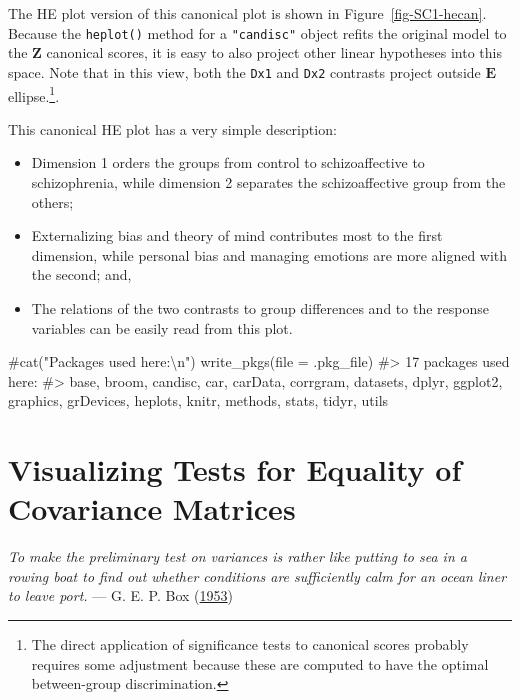\documentclass[
  letterpaper,
  10pt,
  krantz2]{krantz}
\makeatletter
\newenvironment{Shaded}{\begin{snugshade}}{\end{snugshade}}
\newcommand{\AttributeTok}[1]{\textcolor[rgb]{0.40,0.45,0.13}{#1}}
\newcommand{\CommentTok}[1]{\textcolor[rgb]{0.37,0.37,0.37}{#1}}
\newcommand{\FunctionTok}[1]{\textcolor[rgb]{0.28,0.35,0.67}{#1}}
\newcommand{\NormalTok}[1]{\textcolor[rgb]{0.00,0.23,0.31}{#1}}
\providecommand{\tightlist}{%
  \setlength{\itemsep}{0pt}\setlength{\parskip}{0pt}}\usepackage{longtable,booktabs,array}
\renewenvironment{quote}{\begin{VF}}{\end{VF}}
\newenvironment{kframe}{%
  \medskip{}
  \setlength{\fboxsep}{.8em}
  \def\at@end@of@kframe{}%
  \ifinner\ifhmode%
  \def\at@end@of@kframe{\end{minipage}}%
  \begin{minipage}{\columnwidth}%
  \fi\fi%
  \def\FrameCommand##1{\hskip\@totalleftmargin \hskip-\fboxsep
  \colorbox{shadecolor}{##1}\hskip-\fboxsep
      \hskip-\linewidth \hskip-\@totalleftmargin \hskip\columnwidth}%
  \MakeFramed {\advance\hsize-\width
    \@totalleftmargin\z@ \linewidth\hsize
    \@setminipage}}%
{\par\unskip\endMakeFramed%
  \at@end@of@kframe}
\renewenvironment{Shaded}{\begin{kframe}}{\end{kframe}}
\makeatother
\begin{document}
The HE plot version of this canonical plot is shown in
Figure~\ref{fig-SC1-hecan}. Because the \texttt{heplot()} method for a
\texttt{"candisc"} object refits the original model to the
\(\mathbf{Z}\) canonical scores, it is easy to also project other linear
hypotheses into this space. Note that in this view, both the
\texttt{Dx1} and \texttt{Dx2} contrasts project outside \(\mathbf{E}\)
ellipse.\footnote{The direct application of significance tests to
  canonical scores probably requires some adjustment because these are
  computed to have the optimal between-group discrimination.}.

This canonical HE plot has a very simple description:

\begin{itemize}
\tightlist
\item
  Dimension 1 orders the groups from control to schizoaffective to
  schizophrenia, while dimension 2 separates the schizoaffective group
  from the others;
\item
  Externalizing bias and theory of mind contributes most to the first
  dimension, while personal bias and managing emotions are more aligned
  with the second; and,
\item
  The relations of the two contrasts to group differences and to the
  response variables can be easily read from this plot.
\end{itemize}

\begin{Shaded}
\begin{Highlighting}[]
\CommentTok{\#cat("Packages used here:\textbackslash{}n")}
\FunctionTok{write\_pkgs}\NormalTok{(}\AttributeTok{file =}\NormalTok{ .pkg\_file)}
\CommentTok{\#\textgreater{} 17  packages used here:}
\CommentTok{\#\textgreater{}  base, broom, candisc, car, carData, corrgram, datasets, dplyr, ggplot2, graphics, grDevices, heplots, knitr, methods, stats, tidyr, utils}
\end{Highlighting}
\end{Shaded}


\hypertarget{sec-eqcov}{%
\chapter{Visualizing Tests for Equality of Covariance
Matrices}\label{sec-eqcov}}

\begin{quote}
\emph{To make the preliminary test on variances is rather like putting
to sea in a rowing boat to find out whether conditions are sufficiently
calm for an ocean liner to leave port.} --- G. E. P. Box
(\protect\hyperlink{ref-Box:1953}{1953})
\end{quote}
\end{document}
